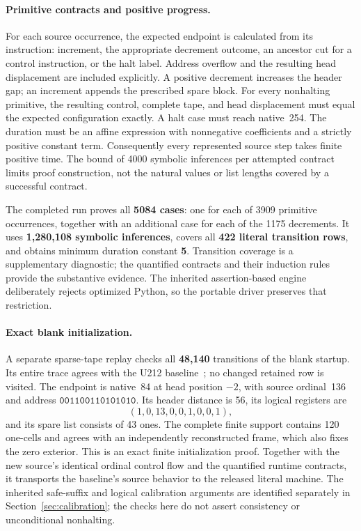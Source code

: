 \paragraph{Primitive contracts and positive progress.}
For each source occurrence, the expected endpoint is calculated from its
instruction: increment, the appropriate decrement outcome, an ancestor
cut for a control instruction, or the halt label. Address overflow and the
resulting head displacement are included explicitly. A positive decrement
increases the header gap; an increment appends the prescribed spare block.
For every nonhalting primitive, the resulting control, complete tape, and
head displacement must equal the expected configuration exactly. A halt
case must reach native~254. The duration must be an affine expression with
nonnegative coefficients and a strictly positive constant term.
Consequently every represented source step takes finite positive time.
The bound of 4000 symbolic inferences per attempted contract limits proof
construction, not the natural values or list lengths covered by a successful
contract.

The completed run proves all \textbf{5084 cases}: one for each of 3909
primitive occurrences, together with an additional case for each of the
1175 decrements. It uses \textbf{1,280,108 symbolic inferences}, covers all
\textbf{422 literal transition rows}, and obtains minimum duration constant
\textbf{5}. Transition coverage is a supplementary diagnostic; the quantified
contracts and their induction rules provide the substantive evidence.
The inherited assertion-based engine deliberately rejects optimized Python,
so the portable driver preserves that restriction.

\paragraph{Exact blank initialization.}
A separate sparse-tape replay checks all \textbf{48,140} transitions of the
blank startup. Its entire trace agrees with the U212 baseline~\cite{combined};
no changed retained row is visited. The endpoint is native~84 at head
position $-2$, with source ordinal~136 and address
$\texttt{001100110101010}$. Its header distance is 56, its logical registers
are
\[
 (1,0,13,0,0,1,0,0,1),
\]
and its spare list consists of 43 ones. The complete finite support contains
120 one-cells and agrees with an independently reconstructed frame, which
also fixes the zero exterior. This is an exact finite initialization proof.
Together with the new source's identical ordinal control flow and the
quantified runtime contracts, it transports the baseline's source behavior
to the released literal machine. The inherited safe-suffix and logical
calibration arguments are identified separately in
Section~\ref{sec:calibration}; the checks here do not assert consistency
or unconditional nonhalting.
